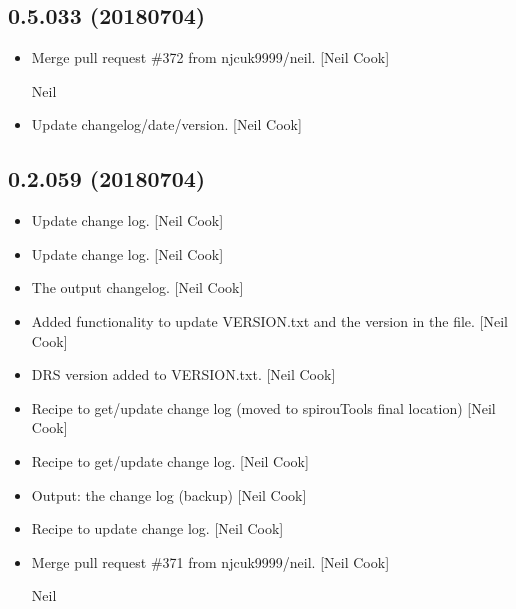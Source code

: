 \documentclass[a4paper,10pt,english]{report}
\begin{document}
\subsection{0.5.033 (2018\sphinxhyphen{}07\sphinxhyphen{}04)}
\label{\detokenize{misc/changelog:id420}}\begin{itemize}
\item {} 
Merge pull request \#372 from njcuk9999/neil. {[}Neil Cook{]}

Neil

\item {} 
Update changelog/date/version. {[}Neil Cook{]}

\end{itemize}


\subsection{0.2.059 (2018\sphinxhyphen{}07\sphinxhyphen{}04)}
\label{\detokenize{misc/changelog:id421}}\begin{itemize}
\item {} 
Update change log. {[}Neil Cook{]}

\item {} 
Update change log. {[}Neil Cook{]}

\item {} 
The output changelog. {[}Neil Cook{]}

\item {} 
Added functionality to update VERSION.txt and the version in the
 file. {[}Neil Cook{]}

\item {} 
DRS version added to VERSION.txt. {[}Neil Cook{]}

\item {} 
Recipe to get/update change log (moved to spirouTools \sphinxhyphen{} final
location) {[}Neil Cook{]}

\item {} 
Recipe to get/update change log. {[}Neil Cook{]}

\item {} 
Output: the change log (backup) {[}Neil Cook{]}

\item {} 
Recipe to update change log. {[}Neil Cook{]}

\item {} 
Merge pull request \#371 from njcuk9999/neil. {[}Neil Cook{]}

Neil

\end{itemize}
\end{document}

